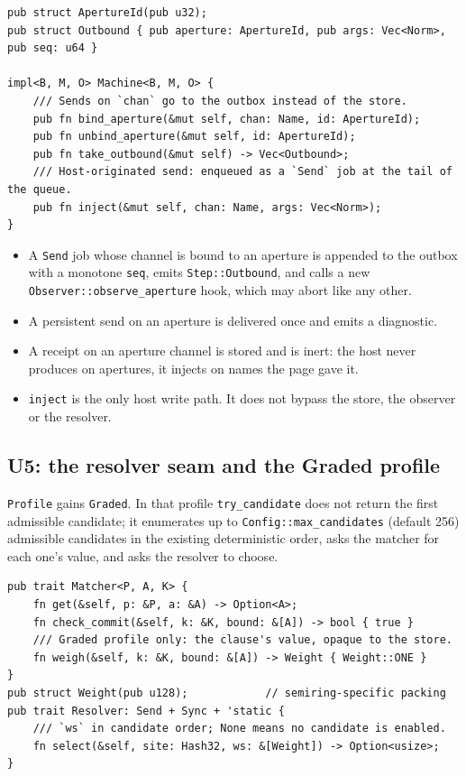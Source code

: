 \documentclass[11pt]{article}
\theoremstyle{definition}
\theoremstyle{remark}
\newcommand{\code}[1]{\texttt{#1}}
\begin{document}
\begin{lstlisting}[language=RustLite]
pub struct ApertureId(pub u32);
pub struct Outbound { pub aperture: ApertureId, pub args: Vec<Norm>, pub seq: u64 }

impl<B, M, O> Machine<B, M, O> {
    /// Sends on `chan` go to the outbox instead of the store.
    pub fn bind_aperture(&mut self, chan: Name, id: ApertureId);
    pub fn unbind_aperture(&mut self, id: ApertureId);
    pub fn take_outbound(&mut self) -> Vec<Outbound>;
    /// Host-originated send: enqueued as a `Send` job at the tail of the queue.
    pub fn inject(&mut self, chan: Name, args: Vec<Norm>);
}
\end{lstlisting}

\begin{itemize}[nosep]
\item A \code{Send} job whose channel is bound to an aperture is appended to the
  outbox with a monotone \code{seq}, emits \code{Step::Outbound}, and calls a new
  \code{Observer::observe\_aperture} hook, which may abort like any other.
\item A persistent send on an aperture is delivered once and emits a diagnostic.
\item A receipt on an aperture channel is stored and is inert: the host never
  produces on apertures, it injects on names the page gave it.
\item \code{inject} is the only host write path. It does not bypass the store,
  the observer or the resolver.
\end{itemize}

\subsection{U5: the resolver seam and the Graded profile}\label{sec:u-resolver}

\code{Profile} gains \code{Graded}. In that profile \code{try\_candidate} does not
return the first admissible candidate; it enumerates up to
\code{Config::max\_candidates} (default 256) admissible candidates in the existing
deterministic order, asks the matcher for each one's value, and asks the resolver to
choose.

\begin{lstlisting}[language=RustLite]
pub trait Matcher<P, A, K> {
    fn get(&self, p: &P, a: &A) -> Option<A>;
    fn check_commit(&self, k: &K, bound: &[A]) -> bool { true }
    /// Graded profile only: the clause's value, opaque to the store.
    fn weigh(&self, k: &K, bound: &[A]) -> Weight { Weight::ONE }
}
pub struct Weight(pub u128);            // semiring-specific packing
pub trait Resolver: Send + Sync + 'static {
    /// `ws` in candidate order; None means no candidate is enabled.
    fn select(&self, site: Hash32, ws: &[Weight]) -> Option<usize>;
}
\end{lstlisting}
\end{document}
